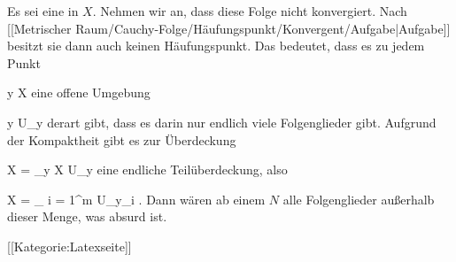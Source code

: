 Es sei
 eine
in $X$. Nehmen wir an, dass diese Folge nicht konvergiert. Nach
[[Metrischer Raum/Cauchy-Folge/Häufungspunkt/Konvergent/Aufgabe|Aufgabe]]
besitzt sie dann auch keinen Häufungspunkt. Das bedeutet, dass es zu jedem Punkt

\mavergleichskette
{\vergleichskette
{ y
}
{ \in }{ X
}
{  }{
}
{    }{
}
{   }{
}
}
{}{}{}
eine offene Umgebung

\mavergleichskette
{\vergleichskette
{ y
}
{ \in }{ U_y
}
{  }{
}
{    }{
}
{   }{
}
}
{}{}{}
derart gibt, dass es darin nur endlich viele Folgenglieder gibt. Aufgrund der Kompaktheit gibt es zur Überdeckung

\mavergleichskettedisp
{\vergleichskette
{ X
}
{ =} { \bigcup_{y \in X} U_y
}
{ } {
}
{ } {
}
{ } {
}
}
{}{}{}
eine endliche Teilüberdeckung, also

\mavergleichskettedisp
{\vergleichskette
{ X
}
{ =} { \bigcup_{ i = 1}^m  U_{y_i }
}
{ } {
}
{ } {
}
{ } {
}
}
{}{}{.}
Dann wären ab einem $N$ alle Folgenglieder außerhalb dieser Menge, was absurd ist.

 [[Kategorie:Latexseite]]
